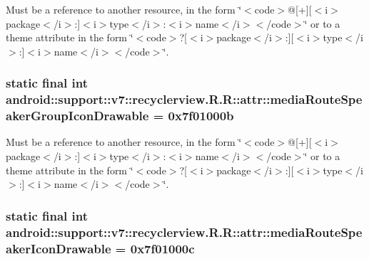 Must be a reference to another resource, in the form \char`\"{}$<$code$>$@\mbox{[}+\mbox{]}\mbox{[}$<$i$>$package$<$/i$>$:\mbox{]}$<$i$>$type$<$/i$>$:$<$i$>$name$<$/i$>$$<$/code$>$\char`\"{} or to a theme attribute in the form \char`\"{}$<$code$>$?\mbox{[}$<$i$>$package$<$/i$>$:\mbox{]}\mbox{[}$<$i$>$type$<$/i$>$:\mbox{]}$<$i$>$name$<$/i$>$$<$/code$>$\char`\"{}. \hypertarget{classandroid_1_1support_1_1v7_1_1recyclerview_1_1_r_1_1attr_52be73ddd9304c8257f8505d5bb9a2d8}{
\subsubsection[{mediaRouteSpeakerGroupIconDrawable}]{\setlength{\rightskip}{0pt plus 5cm}static final int android::support::v7::recyclerview.R.R::attr::mediaRouteSpeakerGroupIconDrawable = 0x7f01000b}}
\label{classandroid_1_1support_1_1v7_1_1recyclerview_1_1_r_1_1attr_52be73ddd9304c8257f8505d5bb9a2d8}


Must be a reference to another resource, in the form \char`\"{}$<$code$>$@\mbox{[}+\mbox{]}\mbox{[}$<$i$>$package$<$/i$>$:\mbox{]}$<$i$>$type$<$/i$>$:$<$i$>$name$<$/i$>$$<$/code$>$\char`\"{} or to a theme attribute in the form \char`\"{}$<$code$>$?\mbox{[}$<$i$>$package$<$/i$>$:\mbox{]}\mbox{[}$<$i$>$type$<$/i$>$:\mbox{]}$<$i$>$name$<$/i$>$$<$/code$>$\char`\"{}. \hypertarget{classandroid_1_1support_1_1v7_1_1recyclerview_1_1_r_1_1attr_b33ca51763c14724f08f5931f0ddfc86}{
\subsubsection[{mediaRouteSpeakerIconDrawable}]{\setlength{\rightskip}{0pt plus 5cm}static final int android::support::v7::recyclerview.R.R::attr::mediaRouteSpeakerIconDrawable = 0x7f01000c}}
\label{classandroid_1_1support_1_1v7_1_1recyclerview_1_1_r_1_1attr_b33ca51763c14724f08f5931f0ddfc86}


